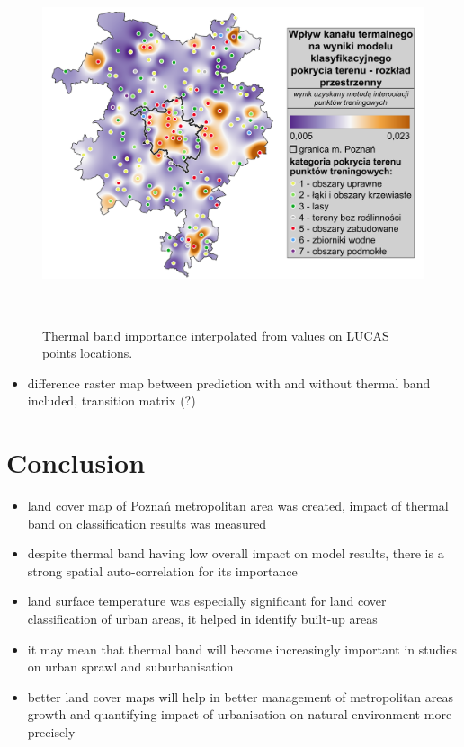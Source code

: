 \documentclass{amuthesis}
\begin{document}
\begin{figure}[t]

{\centering \includegraphics[width=5.875in,height=4.16667in]{./figures/B10_importance-spatial.png}

}

\caption{\label{fig-rycina15}Thermal band importance interpolated from
values on LUCAS points locations.}

\end{figure}

\begin{itemize}
\tightlist
\item
  difference raster map between prediction with and without thermal band
  included, transition matrix (?)
\end{itemize}


\hypertarget{conclusion}{%
\chapter{Conclusion}\label{conclusion}}

\begin{itemize}
\item
  land cover map of Poznań metropolitan area was created, impact of
  thermal band on classification results was measured
\item
  despite thermal band having low overall impact on model results, there
  is a strong spatial auto-correlation for its importance
\item
  land surface temperature was especially significant for land cover
  classification of urban areas, it helped in identify built-up areas
\item
  it may mean that thermal band will become increasingly important in
  studies on urban sprawl and suburbanisation
\item
  better land cover maps will help in better management of metropolitan
  areas growth and quantifying impact of urbanisation on natural
  environment more precisely
\end{itemize}
\end{document}
